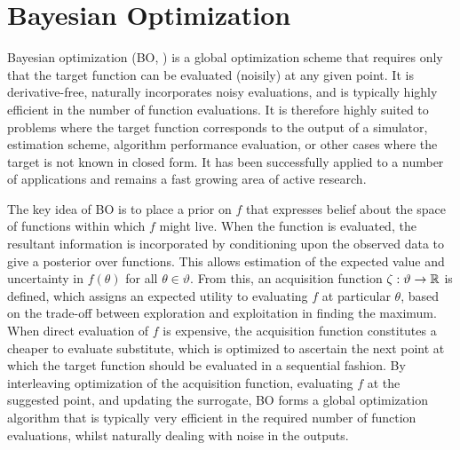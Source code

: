 
\section{Bayesian Optimization}
\label{sec:opt:BO}
Bayesian optimization (BO, \cite{movckus1975bayesian,jones1998efficient,osborne2009gaussian,brochu2010tutorial,shahriari2016taking})  is a 
global optimization scheme that requires only that the target
function can be evaluated (noisily) at any given point.  It is derivative-free,
naturally incorporates noisy evaluations, and is typically highly efficient 
in the number of function evaluations.  It is therefore highly suited to
problems where the target function corresponds to the output of a simulator,
estimation scheme, algorithm performance evaluation, or other cases where
the target is not known in closed form.  It has been successfully applied to 
a number of applications  and remains a fast growing area of
active research.

The key idea of BO is to place a prior on $f$ that expresses belief about the space of functions within which $f$ might live.  When the function is evaluated, the resultant information is incorporated by conditioning upon the observed data to give a posterior over functions.  
This allows estimation of the expected value and uncertainty in $f\left(\theta\right)$ for all $\theta \in \vartheta$.  
From this, an acquisition function $\zeta : \vartheta \rightarrow \mathbb{R}$ is defined, which assigns an expected utility to evaluating $f$ at particular $\theta$, based on the trade-off between exploration and exploitation in finding the maximum.  When direct evaluation of $f$ is expensive, the acquisition function constitutes a cheaper to evaluate substitute, which is optimized to ascertain the next point at which the target function should be evaluated in a sequential fashion.  By interleaving optimization of the acquisition function, evaluating $f$ at the suggested point, and updating the surrogate, BO forms a global optimization algorithm that is typically very efficient in the required number of function evaluations, whilst naturally dealing with noise in the outputs.  

